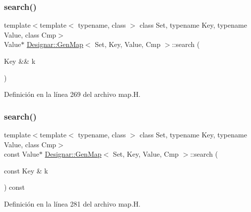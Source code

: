 \subsubsection{\texorpdfstring{search()}{search()}\hspace{0.1cm}{\footnotesize\ttfamily [2/4]}}
{\footnotesize\ttfamily template$<$template$<$ typename, class $>$ class Set, typename Key, typename Value, class Cmp$>$ \\
Value$\ast$ \hyperlink{class_designar_1_1_gen_map}{Designar\+::\+Gen\+Map}$<$ Set, Key, Value, Cmp $>$\+::search (\begin{DoxyParamCaption}\item[{Key \&\&}]{k }\end{DoxyParamCaption})\hspace{0.3cm}{\ttfamily [inline]}}



Definición en la línea 269 del archivo map.\+H.

\mbox{\label{class_designar_1_1_gen_map_a39037bc9d24b92fdcc7a6289db00e59b}} 
\subsubsection{\texorpdfstring{search()}{search()}\hspace{0.1cm}{\footnotesize\ttfamily [3/4]}}
{\footnotesize\ttfamily template$<$template$<$ typename, class $>$ class Set, typename Key, typename Value, class Cmp$>$ \\
const Value$\ast$ \hyperlink{class_designar_1_1_gen_map}{Designar\+::\+Gen\+Map}$<$ Set, Key, Value, Cmp $>$\+::search (\begin{DoxyParamCaption}\item[{const Key \&}]{k }\end{DoxyParamCaption}) const\hspace{0.3cm}{\ttfamily [inline]}}



Definición en la línea 281 del archivo map.\+H.

\mbox{\label{class_designar_1_1_gen_map_a00517c31638c479dca955b9204a2275e}} 
